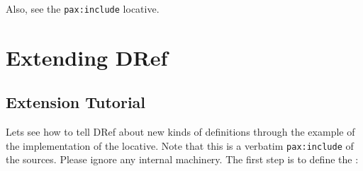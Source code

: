\begin{itemize}
\begin{Shaded}
\begin{Highlighting}[]
\NormalTok{ \textquotesingle{}(}
\OperatorTok{=\textgreater{}} 
\NormalTok{\textgreater{}}
\end{Highlighting}
\end{Shaded}

\begin{Shaded}
\begin{Highlighting}[]
\NormalTok{ \textquotesingle{}(}\NormalTok{))))}
\OperatorTok{=\textgreater{}} 
\end{Highlighting}
\end{Shaded}

  Also, see the \texttt{pax:include} locative.
\end{itemize}

\section{Extending DRef}\label{extending-dref}

\label{x-28DREF-EXT-3A-40EXTENDING-DREF-20MGL-PAX-3ASECTION-29}

\subsection{Extension Tutorial}\label{extension-tutorial}

\label{x-28DREF-EXT-3A-40EXTENSION-TUTORIAL-20MGL-PAX-3ASECTION-29}

Let\textquotesingle s see how to tell DRef about new kinds of
definitions through the example of the implementation of the
 locative.
Note that this is a verbatim \texttt{pax:include} of the sources. Please
ignore any internal machinery. The first step is to define the
:

\begin{Shaded}
\begin{Highlighting}[]
\NormalTok{ (}\NormalTok{)}

\NormalTok{)}
\end{Highlighting}
\end{Shaded}

